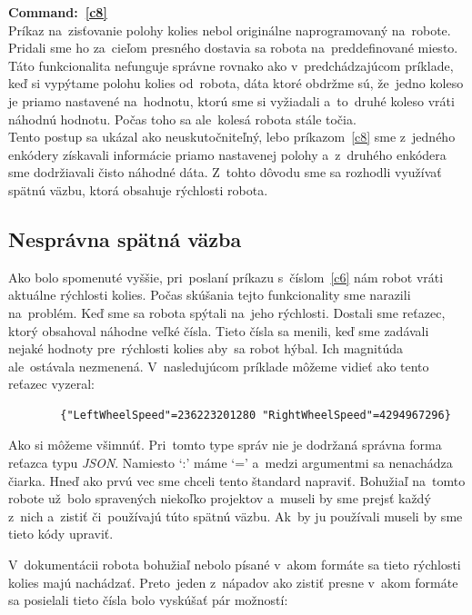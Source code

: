 \noindent \textbf{Command:~\ref{c8}} \\
\indent Príkaz na~zisťovanie polohy kolies nebol originálne naprogramovaný na~robote. Pridali sme ho za~cieľom presného dostavia sa robota
na~preddefinované miesto. Táto funkcionalita nefunguje správne rovnako ako v~predchádzajúcom príklade, keď si vypýtame polohu kolies od~robota,
dáta ktoré obdržme sú, že~jedno koleso je priamo nastavené na~hodnotu, ktorú sme si vyžiadali a~to~druhé koleso vráti náhodnú hodnotu.
Počas toho sa ale~kolesá robota stále točia.\\

Tento postup sa ukázal ako neuskutočniteľný, lebo príkazom~\ref{c8} sme z~jedného enkódery
získavali informácie priamo nastavenej polohy a~z~druhého enkódera sme dodržiavali čisto náhodné dáta.
Z~tohto dôvodu sme sa rozhodli využívať spätnú väzbu, ktorá obsahuje rýchlosti robota.

\clearpage

\subsection{Nesprávna spätná väzba}
\label{subsec:wrongFeedback}

Ako bolo spomenuté vyššie, pri~poslaní príkazu s~číslom~\ref{c6} nám robot vráti aktuálne rýchlosti kolies. Počas skúšania tejto funkcionality
sme narazili na~problém. Keď sme sa robota spýtali na~jeho rýchlosti. Dostali sme reťazec, ktorý obsahoval náhodne veľké čísla. Tieto čísla sa
menili, keď sme zadávali nejaké hodnoty pre~rýchlosti kolies aby~sa robot hýbal. Ich magnitúda ale~ostávala nezmenená. V~nasledujúcom príklade
môžeme vidieť ako tento reťazec vyzeral:

\label{jsonWannabeSpeed}
\begin{lstlisting}
		{"LeftWheelSpeed"=236223201280 "RightWheelSpeed"=4294967296}
\end{lstlisting}

Ako si môžeme všimnúť. Pri~tomto type správ nie je dodržaná správna forma reťazca typu \textit{JSON}.
Namiesto `:' máme `=' a~medzi argumentmi sa nenachádza čiarka. Hneď ako prvú vec sme chceli tento štandard napraviť. Bohužiaľ na~tomto
robote už~bolo spravených niekoľko projektov a~museli by sme prejsť každý z~nich a~zistiť či~používajú túto spätnú väzbu. Ak~by ju používali
museli by sme tieto kódy upraviť.

V~dokumentácii robota bohužiaľ nebolo písané v~akom formáte sa tieto rýchlosti kolies majú nachádzať. Preto~jeden z~nápadov ako zistiť presne
v~akom formáte sa posielali tieto čísla bolo vyskúšať pár možností:

